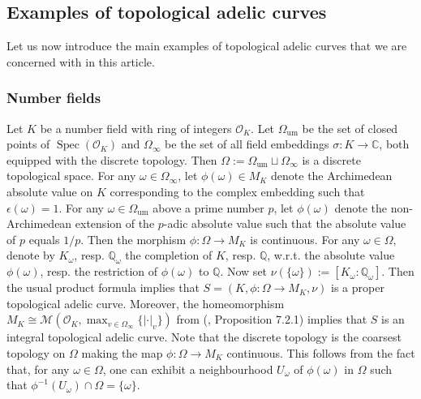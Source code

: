 \documentclass [11pt,reqno]{amsart}
\def\bC{{\mathbb{C}}}
\def\bQ{{\mathbb{Q}}}
\newcommand{\1}{\mathmybb{1}}
\def\cM{{\mathcal{M}}}
\def\cO{{\mathcal{O}}}
\def\cU{{\mathcal{U}}}
\def\diff{\mathrm{d}}
\def\Spec{\operatorname{Spec}}
\def\um{\operatorname{um}}
\begin{document}

\subsection{Examples of topological adelic curves}
\label{sub:examples_tac}

Let us now introduce the main examples of topological adelic curves that we are concerned with in this article.

\subsubsection{Number fields}
\label{subsub:example_number_field_tac}

Let $K$ be a number field with ring of integers $\cO_K$. Let $\Omega_{\um}$ be the set of closed points of $\Spec(\cO_K)$ and $\Omega_{\infty}$ be the set of all field embeddings $\sigma : K \to \bC$, both equipped with the discrete topology. Then $\Omega:= \Omega_{\um} \sqcup \Omega_{\infty}$ is a discrete topological space. For any $\omega\in \Omega_{\infty}$, let $\phi(\omega)\in M_K$ denote the Archimedean absolute value on $K$ corresponding to the complex embedding such that $\epsilon(\omega)=1$. For any $\omega\in\Omega_{\um}$ above a prime number $p$, let $\phi(\omega)$ denote the non-Archimedean extension of the $p$-adic absolute value such that the absolute value of $p$ equals $1/p$. Then the morphism $\phi : \Omega \to M_{K}$ is continuous. For any $\omega\in \Omega$, denote by $K_{\omega}$, resp. $\bQ_{\omega}$ the completion of $K$, resp. $\bQ$, w.r.t. the absolute value $\phi(\omega)$, resp. the restriction of $\phi(\omega)$ to $\bQ$. Now set $\nu(\{\omega\}):=[K_{\omega}:\bQ_{\omega}]$. Then the usual product formula implies that $S=(K,\phi:\Omega\to M_K,\nu)$ is a proper topological adelic curve. Moreover, the homeomorphism $M_K\cong\cM(\cO_K,\max_{v\in\Omega_{\infty}} \{|\cdot|_v\})$ from (\cite{Sedillot_pav}, Proposition 7.2.1) implies that $S$ is an integral topological adelic curve. Note that the discrete topology is the coarsest topology on $\Omega$ making the map $\phi : \Omega \to M_{K}$ continuous. This follows from the fact that, for any $\omega\in \Omega$, one can exhibit a neighbourhood $U_{\omega}$ of $\phi(\omega)$ in $\Omega$ such that $\phi^{-1}(U_{\omega}) \cap \Omega = \{\omega\}$. 
\end{document}
